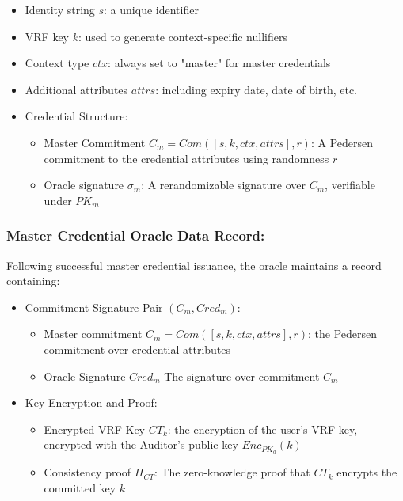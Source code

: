 {\begin{itemize}
    \item Identity string $s$: a unique identifier
    \item VRF key $k$: used to generate context-specific nullifiers
    \item Context type $ctx$: always set to "master" for master credentials
    \item Additional attributes $attrs$: including expiry date, date of birth, etc.
    \item Credential Structure:
    \begin{itemize}
        \item Master Commitment $C_m = Com([s, k, ctx, attrs],r)$: A Pedersen commitment to the credential attributes using randomness $r$
        \item Oracle signature $\sigma_m$: A rerandomizable signature over $C_m$, verifiable under $PK_m$
    \end{itemize}
\end{itemize}

\subsubsection{Master Credential Oracle Data Record:} Following successful master credential issuance, the oracle maintains a record containing:
\begin{itemize}
    \item Commitment-Signature Pair $(C_m, Cred_m)$:
    \begin{itemize}
        \item Master commitment $C_m = Com([s,k,ctx,attrs],r)$: the Pedersen commitment over credential attributes
        \item Oracle Signature $Cred_m$ The signature over commitment $C_m$
    \end{itemize}
    \item Key Encryption and Proof:
    \begin{itemize}
        \item Encrypted VRF Key $CT_k$: the encryption of the user's VRF key, encrypted with the Auditor's public key $Enc_{PK_a}(k)$
        \item Consistency proof $\Pi_{CT}$: The zero-knowledge proof that $CT_k$ encrypts the committed key $k$
    \end{itemize}
\end{itemize}


}
